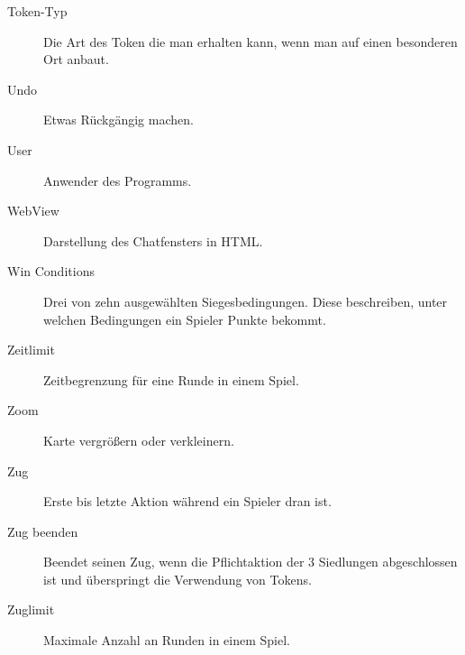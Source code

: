 \documentclass[a4paper]{scrreprt}
\begin{document}
\begin{description}
	\item[Token-Typ] Die Art des Token die man erhalten kann, wenn man auf einen besonderen Ort anbaut.
	\item[Undo] Etwas Rückgängig machen.
	\item[User] Anwender des Programms.
	\item[WebView] Darstellung des Chatfensters in HTML.
	\item[Win Conditions] Drei von zehn ausgewählten Siegesbedingungen. Diese beschreiben, unter welchen Bedingungen ein Spieler Punkte bekommt.
	\item[Zeitlimit] Zeitbegrenzung für eine Runde in einem Spiel.
	\item[Zoom] Karte vergrößern oder verkleinern.
	\item[Zug] Erste bis letzte Aktion während ein Spieler dran ist.
	\item[Zug beenden] Beendet seinen Zug, wenn die Pflichtaktion der 3 Siedlungen abgeschlossen ist und überspringt die Verwendung von Tokens.
	\item[Zuglimit] Maximale Anzahl an Runden in einem Spiel.
\end{description}
\end{document}
